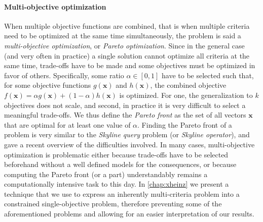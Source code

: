 	\paragraph{Multi-objective optimization}
	When multiple objective functions are combined, that is when multiple criteria need to be optimized at the same time simultaneously, the problem is said a \emph{multi-objective optimization}, or \emph{Pareto optimization}.
	Since in the general case (and very often in practice) a single solution cannot optimize all criteria at the same time, trade-offs have to be made and some objectives must be optimized in favor of others.
	Specifically, some ratio $\alpha \in [0, 1]$ have to be selected such that, for some objective functions $g(\mathbf{x})$ and $h(\mathbf{x})$, the combined objective $f(\mathbf{x}) = \alpha{}g(\mathbf{x}) + (1 - \alpha{})h(\mathbf{x})$ is optimized.
	For one, the generalization to $k$ objectives does not scale, and second, in practice it is very difficult to select a meaningful trade-offs.
	We thus define the \emph{Pareto front} as the set of all vectors $\mathbf{x}$ that are optimal for at least one value of $\alpha$.
	Finding the Pareto front of a problem is very similar to the \emph{Skyline query} problem (or \emph{Skyline operator}), and \textcite{rekatsinas2015finding} gave a recent overview of the difficulties involved.
	In many cases, multi-objective optimization is problematic either because trade-offs have to be selected beforehand without a well defined models for the consequences, or because computing the Pareto front (or a part) understandably remains a computationally intensive task to this day.
	In \cref{chap:xheinz} we present a technique that we use to express an inherently multi-criteria problem into a constrained single-objective problem, therefore preventing some of the aforementioned problems and allowing for an easier interpretation of our results.

